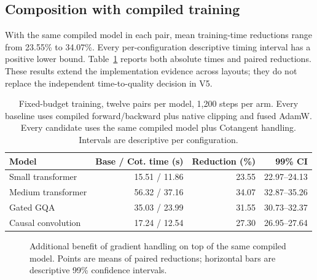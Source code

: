 \documentclass[11pt]{article}
\begin{document}
\subsection{Composition with compiled training}
With the same compiled model in each pair, mean training-time reductions range from 23.55\% to 34.07\%. Every per-configuration descriptive timing interval has a positive lower bound. Table~\ref{tab:breadth} reports both absolute times and paired reductions. These results extend the implementation evidence across layouts; they do not replace the independent time-to-quality decision in V5.
\begin{table}[H]
\centering
\small
\begin{tabular}{@{}lrrr@{}}
\toprule
Model & Base / Cot. time (s) & Reduction (\%) & 99\% CI\\
\midrule
Small transformer & 15.51 / 11.86 & 23.55 & 22.97--24.13 \\
Medium transformer & 56.32 / 37.16 & 34.07 & 32.87--35.26 \\
Gated GQA & 35.03 / 23.99 & 31.55 & 30.73--32.37 \\
Causal convolution & 17.24 / 12.54 & 27.30 & 26.95--27.64 \\
\bottomrule
\end{tabular}
\caption{Fixed-budget training, twelve pairs per model, 1,200 steps per arm.
Every baseline uses compiled forward/backward plus native clipping and fused
AdamW. Every candidate uses the same compiled model plus Cotangent handling.
Intervals are descriptive per configuration.}
\label{tab:breadth}
\end{table}

\begin{figure}[H]
\centering
{}
\caption{Additional benefit of gradient handling on top of the same compiled
model. Points are means of paired reductions; horizontal bars are descriptive
99\% confidence intervals.}
\label{fig:breadth}
\end{figure}
\end{document}
